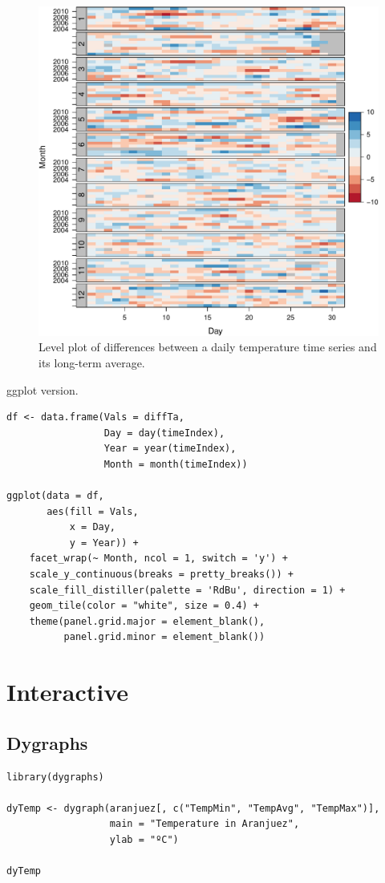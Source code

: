 \documentclass[smallroyalvopaper]{memoir}
\begin{document}
\begin{figure}[htbp]
\centering
\includegraphics[width=.9\linewidth]{figs/diffTa_levelplot.pdf}
\caption{Level plot of differences between a daily temperature time series and its long-term average. \label{fig:diffTa_level}}
\end{figure}

ggplot version.
\lstset{language=r,label= ,caption= ,captionpos=b,numbers=none}
\begin{lstlisting}
df <- data.frame(Vals = diffTa,
                 Day = day(timeIndex),
                 Year = year(timeIndex),
                 Month = month(timeIndex))

ggplot(data = df,
       aes(fill = Vals,
           x = Day,
           y = Year)) +
    facet_wrap(~ Month, ncol = 1, switch = 'y') +
    scale_y_continuous(breaks = pretty_breaks()) + 
    scale_fill_distiller(palette = 'RdBu', direction = 1) + 
    geom_tile(color = "white", size = 0.4) +
    theme(panel.grid.major = element_blank(),
          panel.grid.minor = element_blank())
\end{lstlisting}


\section{Interactive}
\label{sec:org4746381}

\subsection{Dygraphs \label{sec:dygraphs}}
\label{sec:org0bdba69}
\lstset{language=r,label= ,caption= ,captionpos=b,numbers=none}
\begin{lstlisting}
library(dygraphs)

dyTemp <- dygraph(aranjuez[, c("TempMin", "TempAvg", "TempMax")],
                  main = "Temperature in Aranjuez",
                  ylab = "ºC")

dyTemp
\end{lstlisting}
\end{document}
